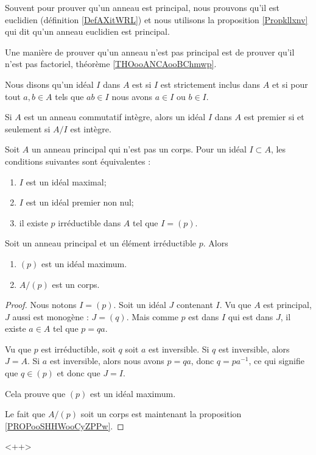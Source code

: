 Souvent pour prouver qu'un anneau est principal, nous prouvons qu'il est euclidien (définition \ref{DefAXitWRL}) et nous utilisons la proposition \ref{Propkllxnv} qui dit qu'un anneau euclidien est principal.

Une manière de prouver qu'un anneau n'est pas principal est de prouver qu'il n'est pas factoriel, théorème \ref{THOooANCAooBChmwp}.

\begin{definition}
    Nous disons qu'un idéal \( I\) dans \( A\) est  si \( I\) est strictement inclus dans \( A\) et si pour tout \( a,b\in A\) tels que \( ab\in I\) nous avons \( a\in I\) ou \( b\in I\).
\end{definition}

\begin{proposition}     \label{PROPooHABIooBZZQMj}
    Si \( A\) est un anneau commutatif intègre, alors un idéal \( I\) dans \( A\) est premier si et seulement si \( A/I\) est intègre. 
\end{proposition}

\begin{proposition} \label{PropomqcGe}
    Soit \( A\) un anneau principal qui n'est pas un corps. Pour un idéal \( I\subset A\), les conditions suivantes sont équivalentes :
    \begin{enumerate}
        \item
            \( I\) est un idéal maximal;
        \item
            \( I\) est un idéal premier non nul;
        \item
            il existe \( p\) irréductible dans \( A\) tel que \( I=(p)\).
    \end{enumerate}
\end{proposition}

\begin{proposition}     \label{PropoTMMXCx}
    Soit un anneau principal et un élément irréductible \( p\). Alors
    \begin{enumerate}
        \item
            \( (p)\) est un idéal maximum.
        \item       \label{ITEMooKPJQooWuPZXS}
            \( A/(p)\) est un corps.
    \end{enumerate}
\end{proposition}

\begin{proof}
    Nous notons \( I=(p)\). Soit un idéal \( J\) contenant \( I\). Vu que \( A\) est principal, \( J\) aussi est monogène : \( J=(q)\). Mais comme \( p\) est dans \( I\) qui est dans \( J\), il existe \( a\in A\) tel que \( p=qa\).

    Vu que \( p\) est irréductible, soit \( q\) soit \( a\) est inversible. Si \( q\) est inversible, alors \( J=A\). Si \( a\) est inversible, alors nous avons \( p=qa\), donc \( q=pa^{-1}\), ce qui signifie que \( q\in(p)\) et donc que \( J=I\).

    Cela prouve que \( (p)\) est un idéal maximum.

    Le fait que \( A/(p)\) soit un corps est maintenant la proposition \ref{PROPooSHHWooCyZPPw}.
\end{proof}
<++>


